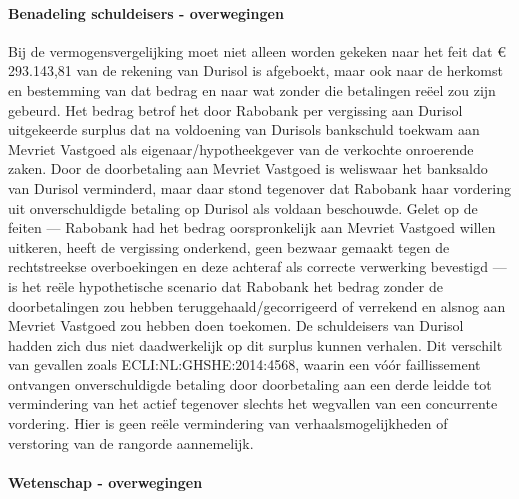 \documentclass[
  dutch,
  a4paper,
]{article}
\begin{document}
\paragraph{Benadeling schuldeisers - overwegingen}\label{benadeling-schuldeisers---overwegingen-13}

Bij de vermogensvergelijking moet niet alleen worden gekeken naar het feit dat € 293.143,81 van de rekening van Durisol is afgeboekt, maar ook naar de herkomst en bestemming van dat bedrag en naar wat zonder die betalingen reëel zou zijn gebeurd. Het bedrag betrof het door Rabobank per vergissing aan Durisol uitgekeerde surplus dat na voldoening van Durisols bankschuld toekwam aan Mevriet Vastgoed als eigenaar/hypotheekgever van de verkochte onroerende zaken. Door de doorbetaling aan Mevriet Vastgoed is weliswaar het banksaldo van Durisol verminderd, maar daar stond tegenover dat Rabobank haar vordering uit onverschuldigde betaling op Durisol als voldaan beschouwde. Gelet op de feiten --- Rabobank had het bedrag oorspronkelijk aan Mevriet Vastgoed willen uitkeren, heeft de vergissing onderkend, geen bezwaar gemaakt tegen de rechtstreekse overboekingen en deze achteraf als correcte verwerking bevestigd --- is het reële hypothetische scenario dat Rabobank het bedrag zonder de doorbetalingen zou hebben teruggehaald/gecorrigeerd of verrekend en alsnog aan Mevriet Vastgoed zou hebben doen toekomen. De schuldeisers van Durisol hadden zich dus niet daadwerkelijk op dit surplus kunnen verhalen. Dit verschilt van gevallen zoals ECLI:NL:GHSHE:2014:4568, waarin een vóór faillissement ontvangen onverschuldigde betaling door doorbetaling aan een derde leidde tot vermindering van het actief tegenover slechts het wegvallen van een concurrente vordering. Hier is geen reële vermindering van verhaalsmogelijkheden of verstoring van de rangorde aannemelijk.

\paragraph{Wetenschap - overwegingen}\label{wetenschap---overwegingen-13}
\end{document}
